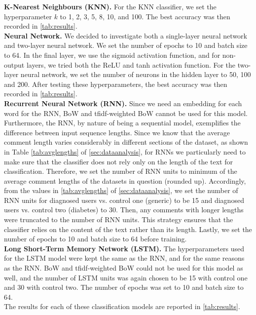 \documentclass[11pt,a4paper]{article}
\begin{document}
\indent \textbf{K-Nearest Neighbours (KNN).} For the KNN classifier, we set the hyperparameter $k$ to 1, 2, 3, 5, 8, 10, and 100. The best accuracy was then recorded in \autoref{tab:results}. \\
\indent \textbf{Neural Network.} We decided to investigate both a single-layer neural network and two-layer neural network. We set the number of epochs to 10 and batch size to 64. In the final layer, we use the sigmoid activation function, and for non-output layers, we tried both the ReLU and tanh activation function. For the two-layer neural network, we set the number of neurons in the hidden layer to 50, 100 and 200. After testing these hyperparameters, the best accuracy was then recorded in \autoref{tab:results}. \\
\indent \textbf{Recurrent Neural Network (RNN).} Since we need an embedding for each word for the RNN, BoW and tfidf-weighted BoW cannot be used for this model. Furthermore, the RNN, by nature of being a sequential model, exemplifies the difference between input sequence lengths. Since we know that the average comment length varies considerably in different sections of the dataset, as shown in Table \ref{tab:avglengths} of \autoref{sec:dataanalysis}, for RNNs we particularly need to make sure that the classifier does not rely only on the length of the text for classification. Therefore, we set the number of RNN units to minimum of the average comment lengths of the datasets in question (rounded up). Accordingly, from the values in \autoref{tab:avglengths} of \autoref{sec:dataanalysis}, we set the number of RNN units for diagnosed users vs. control one (generic) to be 15 and diagnosed users vs. control two (diabetes) to 30. Then, any comments with longer lengths were truncated to the number of RNN units. This strategy ensures that the classifier relies on the content of the text rather than its length. Lastly, we set the number of epochs to 10 and batch size to 64 before training. \\
\indent \textbf{Long Short-Term Memory Network (LSTM).} The hyperparameters used for the LSTM model were kept the same as the RNN, and for the same reasons as the RNN. BoW and tfidf-weighted BoW could not be used for this model as well, and the number of LSTM units was again chosen to be 15 with control one and 30 with control two. The number of epochs was set to 10 and batch size to 64. \\
\indent The results for each of these classification models are reported in \autoref{tab:results}. \\
\end{document}
